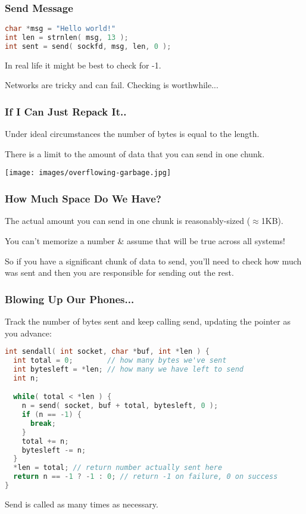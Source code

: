 \begin{frame}[fragile]
	\frametitle{Send Message}

	\begin{lstlisting}[language=C]
char *msg = "Hello world!"
int len = strnlen( msg, 13 );
int sent = send( sockfd, msg, len, 0 );
\end{lstlisting}

	In real life it might be best to check for -1.

	Networks are tricky and can fail. Checking is worthwhile...

\end{frame}



\begin{frame}
	\frametitle{If I Can Just Repack It..}

	Under ideal circumstances the number of bytes is equal to the length.

	There is a limit to the amount of data that you can send in one chunk.

	\begin{center}
		\texttt{[image: images/overflowing-garbage.jpg]}
	\end{center}

\end{frame}



\begin{frame}
	\frametitle{How Much Space Do We Have?}

	The actual amount you can send in one chunk is reasonably-sized ($\approx$1KB).

	You can't memorize a number \& assume that will be true across all systems!

	So if you have a significant chunk of data to send, you'll need to check how much was sent and then you are responsible for sending out the rest.

\end{frame}



\begin{frame}[fragile]
	\frametitle{Blowing Up Our Phones...}

	Track the number of bytes sent and keep calling send, updating the pointer as you advance:

	\begin{lstlisting}[language=C]
int sendall( int socket, char *buf, int *len ) {
  int total = 0;        // how many bytes we've sent
  int bytesleft = *len; // how many we have left to send
  int n;

  while( total < *len ) {
    n = send( socket, buf + total, bytesleft, 0 );
    if (n == -1) { 
      break; 
    }
    total += n;
    bytesleft -= n;
  }
  *len = total; // return number actually sent here
  return n == -1 ? -1 : 0; // return -1 on failure, 0 on success
}
\end{lstlisting}

	Send is called as many times as necessary.

\end{frame}



